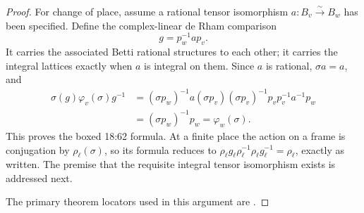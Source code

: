 \begin{proof}
For change of place, assume a rational tensor isomorphism
\(a:B_v\xrightarrow{\sim}B_w\) has been specified. Define the
complex-linear de Rham comparison
\[
g=p_w^{-1}a p_v.
\]
It carries the associated Betti rational structures to each other;
it carries the integral lattices exactly when \(a\) is integral on
them. Since \(a\) is rational, \(\sigma a=a\), and
\[
\begin{aligned}
\sigma(g)\varphi_v(\sigma)g^{-1}
&=(\sigma p_w)^{-1}a(\sigma p_v)
 (\sigma p_v)^{-1}p_v p_v^{-1}a^{-1}p_w\\
&=(\sigma p_w)^{-1}p_w
=\varphi_w(\sigma).
\end{aligned}
\tag{D.5.1.1}
\]
This proves the boxed 18:62 formula. At a finite place the action
on a frame is conjugation by \(\rho_\ell(\sigma)\), so its formula
reduces to
\(\rho_\ell g_\ell\rho_\ell^{-1}\rho_\ell g_\ell^{-1}
=\rho_\ell\), exactly as written. The premise that the requisite
integral tensor isomorphism exists is addressed next.

The primary theorem locators used in this argument are \cite[Theorem 3.2]{GenDeligneMilne}.
\end{proof}


